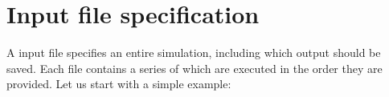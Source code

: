 \section{Input file specification}

A \prog input file specifies an entire simulation, including which output should be saved. Each file contains a series of  which are executed in the order they are provided. Let us start with a simple example:

